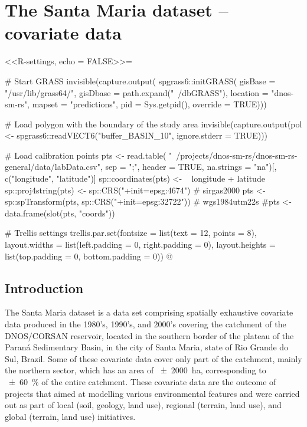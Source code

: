 
\artigofalse
\chapter{The Santa Maria dataset -- covariate data}
\label{apen:covar-data}
\usepackage[utf8]{inputenc}

<<R-settings, echo = FALSE>>=
 
 # Start GRASS
 invisible(capture.output(
   spgrass6::initGRASS(
     gisBase = "/usr/lib/grass64/", gisDbase = path.expand("~/dbGRASS"),
     location = "dnos-sm-rs", mapset = "predictions", pid = Sys.getpid(), override = TRUE)))
 
 # Load polygon with the boundary of the study area
 invisible(capture.output(pol <- spgrass6::readVECT6("buffer_BASIN_10", ignore.stderr = TRUE)))
 
 # Load calibration points
 pts <- read.table(
  "~/projects/dnos-sm-rs/dnos-sm-rs-general/data/labData.csv", sep = ";",
  header = TRUE, na.strings = "na")[, c("longitude", "latitude")]
 sp::coordinates(pts) <- ~ longitude + latitude
 sp::proj4string(pts) <- sp::CRS("+init=epsg:4674") # sirgas2000
 pts <- sp::spTransform(pts, sp::CRS("+init=epsg:32722")) # wgs1984utm22s
 #pts <- data.frame(slot(pts, "coords"))
 
 # Trellis settings
 trellis.par.set(fontsize = list(text = 12, points = 8),
      layout.widths = list(left.padding = 0, right.padding = 0),
      layout.heights = list(top.padding = 0, bottom.padding = 0))
@

\tocless\section{Introduction}
\label{sec:covar-data-intro}

The Santa Maria dataset is a data set comprising spatially exhaustive covariate data produced in the 1980's, 
1990's, and 2000's covering the catchment of the DNOS/CORSAN reservoir, located in the southern border of the 
plateau of the Paraná Sedimentary Basin, in the city of Santa Maria, state of Rio Grande do Sul, Brazil. Some 
of these covariate data cover only part of the catchment, mainly the northern sector, which has an area of 
\SI{\pm2000}{\hectare}, corresponding to \SI{\pm60}{\percent} of the entire catchment. These covariate data 
are the outcome of projects that aimed at modelling various environmental features and were carried out as 
part of local (soil, geology, land use), regional (terrain, land use), and global (terrain, land use) 
initiatives.

